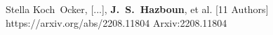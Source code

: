          {Stella Koch~{Ocker}, [...], \textbf{J.~S.~{Hazboun}}, et al. [11 Authors]}
         {https://arxiv.org/abs/2208.11804}
         {{Arxiv:}2208.11804}

